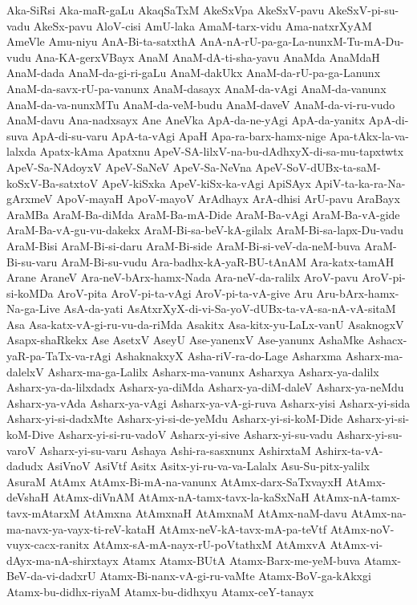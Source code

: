 {Aka-SiRsi
Aka-maR-gaLu
AkaqSaTxM
AkeSxVpa
AkeSxV-pavu
AkeSxV-pi-su-vadu
AkeSx-pavu
AloV-cisi
AmU-laka
AmaM-tarx-vidu
Ama-natxrXyAM
AmeVle
Amu-niyu
AnA-Bi-ta-satxthA
AnA-nA-rU-pa-ga-La-nunxM-Tu-mA-Du-vudu
Ana-KA-gerxVBayx
AnaM
AnaM-dA-ti-sha-yavu
AnaMda
AnaMdaH
AnaM-dada
AnaM-da-gi-ri-gaLu
AnaM-dakUkx
AnaM-da-rU-pa-ga-Lanunx
AnaM-da-savx-rU-pa-vanunx
AnaM-dasayx
AnaM-da-vAgi
AnaM-da-vanunx
AnaM-da-va-nunxMTu
AnaM-da-veM-budu
AnaM-daveV
AnaM-da-vi-ru-vudo
AnaM-davu
Ana-nadxsayx
Ane
AneVka
ApA-da-ne-yAgi
ApA-da-yanitx
ApA-di-suva
ApA-di-su-varu
ApA-ta-vAgi
ApaH
Apa-ra-barx-hamx-nige
Apa-tAkx-la-va-lalxda
Apatx-kAma
Apatxnu
ApeV-SA-lilxV-na-bu-dAdhxyX-di-sa-mu-tapxtwtx
ApeV-Sa-NAdoyxV
ApeV-SaNeV
ApeV-Sa-NeVna
ApeV-SoV-dUBx-ta-saM-koSxV-Ba-satxtoV
ApeV-kiSxka
ApeV-kiSx-ka-vAgi
ApiSAyx
ApiV-ta-ka-ra-Na-gArxmeV
ApoV-mayaH
ApoV-mayoV
ArAdhayx
ArA-dhisi
ArU-pavu
AraBayx
AraMBa
AraM-Ba-diMda
AraM-Ba-mA-Dide
AraM-Ba-vAgi
AraM-Ba-vA-gide
AraM-Ba-vA-gu-vu-dakekx
AraM-Bi-sa-beV-kA-gilalx
AraM-Bi-sa-lapx-Du-vadu
AraM-Bisi
AraM-Bi-si-daru
AraM-Bi-side
AraM-Bi-si-veV-da-neM-buva
AraM-Bi-su-varu
AraM-Bi-su-vudu
Ara-badhx-kA-yaR-BU-tAnAM
Ara-katx-tamAH
Arane
AraneV
Ara-neV-bArx-hamx-Nada
Ara-neV-da-ralilx
AroV-pavu
AroV-pi-si-koMDa
AroV-pita
AroV-pi-ta-vAgi
AroV-pi-ta-vA-give
Aru
Aru-bArx-hamx-Na-ga-Live
AsA-da-yati
AsAtxrXyX-di-vi-Sa-yoV-dUBx-ta-vA-sa-nA-vA-sitaM
Asa
Asa-katx-vA-gi-ru-vu-da-riMda
Asakitx
Asa-kitx-yu-LaLx-vanU
AsaknogxV
Asapx-shaRkekx
Ase
AsetxV
AseyU
Ase-yanenxV
Ase-yanunx
AshaMke
Ashacx-yaR-pa-TaTx-va-rAgi
AshaknakxyX
Asha-riV-ra-do-Lage
Asharxma
Asharx-ma-dalelxV
Asharx-ma-ga-Lalilx
Asharx-ma-vanunx
Asharxya
Asharx-ya-dalilx
Asharx-ya-da-lilxdadx
Asharx-ya-diMda
Asharx-ya-diM-daleV
Asharx-ya-neMdu
Asharx-ya-vAda
Asharx-ya-vAgi
Asharx-ya-vA-gi-ruva
Asharx-yisi
Asharx-yi-sida
Asharx-yi-si-dadxMte
Asharx-yi-si-de-yeMdu
Asharx-yi-si-koM-Dide
Asharx-yi-si-koM-Dive
Asharx-yi-si-ru-vadoV
Asharx-yi-sive
Asharx-yi-su-vadu
Asharx-yi-su-varoV
Asharx-yi-su-varu
Ashaya
Ashi-ra-sasxnunx
AshirxtaM
Ashirx-ta-vA-dadudx
AsiVnoV
AsiVtf
Asitx
Asitx-yi-ru-va-va-Lalalx
Asu-Su-pitx-yalilx
AsuraM
AtAmx
AtAmx-Bi-mA-na-vanunx
AtAmx-darx-SaTxvayxH
AtAmx-deVshaH
AtAmx-diVnAM
AtAmx-nA-tamx-tavx-la-kaSxNaH
AtAmx-nA-tamx-tavx-mAtarxM
AtAmxna
AtAmxnaH
AtAmxnaM
AtAmx-naM-davu
AtAmx-na-ma-navx-ya-vayx-ti-reV-kataH
AtAmx-neV-kA-tavx-mA-pa-teVtf
AtAmx-noV-vuyx-cacx-ranitx
AtAmx-sA-mA-nayx-rU-poVtathxM
AtAmxvA
AtAmx-vi-dAyx-ma-nA-shirxtayx
Atamx
Atamx-BUtA
Atamx-Barx-me-yeM-buva
Atamx-BeV-da-vi-dadxrU
Atamx-Bi-nanx-vA-gi-ru-vaMte
Atamx-BoV-ga-kAkxgi
Atamx-bu-didhx-riyaM
Atamx-bu-didhxyu
Atamx-ceY-tanayx
}
